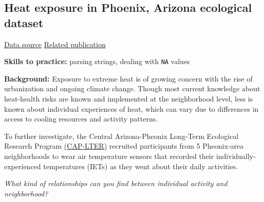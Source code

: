 \documentclass[
  letterpaper,
  DIV=11,
  numbers=noendperiod]{scrreprt}
\begin{document}
\subsection{Heat exposure in Phoenix, Arizona ecological
dataset}\label{heat-exposure-in-phoenix-arizona-ecological-dataset}

\href{https://data.sustainability-innovation.asu.edu/cap-portal/metadataviewer?packageid=knb-lter-cap.647.2}{Data
source} \textbar{}
\href{https://doi.org/10.1016/j.envint.2020.106271}{Related publication}

\textbf{Skills to practice:} parsing strings, dealing with \texttt{NA}
values

\textbf{Background:} Exposure to extreme heat is of growing concern with
the rise of urbanization and ongoing climate change. Though most current
knowledge about heat-health risks are known and implemented at the
neighborhood level, less is known about individual experiences of heat,
which can vary due to differences in access to cooling resources and
activity patterns.

To further investigate, the Central Arizona-Pheonix Long-Term Ecological
Research Program
\href{https://sustainability-innovation.asu.edu/caplter/}{(CAP-LTER)}
recruited participants from 5 Pheonix-area neighborhoods to wear air
temperature sensors that recorded their individually-experienced
temperatures (IETs) as they went about their daily activities.

\emph{What kind of relationships can you find between individual
activity and neighborhood?}
\end{document}

